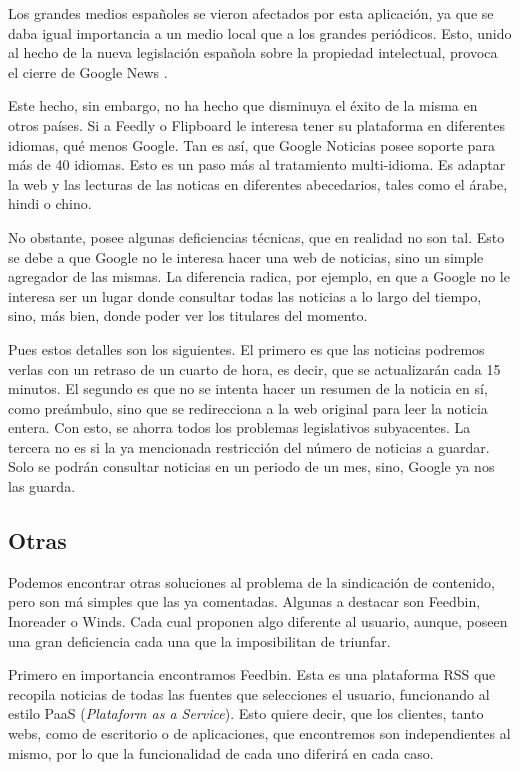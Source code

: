 Los grandes medios españoles se vieron afectados por esta aplicación, ya que se daba igual importancia a un medio local que a los grandes periódicos. Esto, unido al hecho de la nueva legislación española sobre la propiedad intelectual, provoca el cierre de Google News .

Este hecho, sin embargo, no ha hecho que disminuya el éxito de la misma en otros países. Si a Feedly o Flipboard le interesa tener su plataforma en diferentes idiomas, qué menos Google. Tan es así, que Google Noticias posee soporte para más de 40 idiomas. Esto es un paso más al tratamiento multi-idioma. Es adaptar la web y las lecturas de las noticas en diferentes abecedarios, tales como el árabe, hindi o chino.

No obstante, posee algunas deficiencias técnicas, que en realidad no son tal. Esto se debe a que Google no le interesa hacer una web de noticias, sino un simple agregador de las mismas. La diferencia radica, por ejemplo, en que a Google no le interesa ser un lugar donde consultar todas las noticias a lo largo del tiempo, sino, más bien, donde poder ver los titulares del momento.


Pues estos detalles son los siguientes. El primero es que las noticias podremos verlas con un retraso de un cuarto de hora, es decir, que se actualizarán cada 15 minutos. El segundo es que no se intenta hacer un resumen de la noticia en sí, como preámbulo, sino que se redirecciona a la web original para leer la noticia entera. Con esto, se ahorra todos los problemas legislativos subyacentes. La tercera no es si la ya mencionada restricción del número de noticias a guardar. Solo se podrán consultar noticias en un periodo de un mes, sino, Google ya nos las guarda.

\subsection{Otras}

Podemos encontrar otras soluciones al problema de la sindicación de contenido, pero son má simples que las ya comentadas. Algunas a destacar son Feedbin, Inoreader o Winds. Cada cual proponen algo diferente al usuario, aunque, poseen una gran deficiencia cada una que la imposibilitan de triunfar.

Primero en importancia encontramos Feedbin. Esta es una plataforma RSS que recopila noticias de todas las fuentes que selecciones el usuario, funcionando al estilo PaaS (\textit{Plataform as a Service}). Esto quiere decir, que los clientes, tanto webs, como de escritorio o de aplicaciones, que encontremos son independientes al mismo, por lo que la funcionalidad de cada uno diferirá en cada caso.


